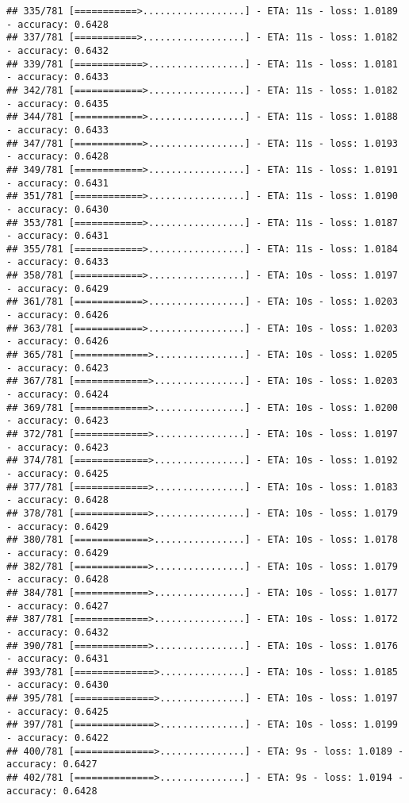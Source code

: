 \documentclass[
]{article}
\begin{document}
\begin{verbatim}
## 335/781 [===========>..................] - ETA: 11s - loss: 1.0189 - accuracy: 0.6428
## 337/781 [===========>..................] - ETA: 11s - loss: 1.0182 - accuracy: 0.6432
## 339/781 [============>.................] - ETA: 11s - loss: 1.0181 - accuracy: 0.6433
## 342/781 [============>.................] - ETA: 11s - loss: 1.0182 - accuracy: 0.6435
## 344/781 [============>.................] - ETA: 11s - loss: 1.0188 - accuracy: 0.6433
## 347/781 [============>.................] - ETA: 11s - loss: 1.0193 - accuracy: 0.6428
## 349/781 [============>.................] - ETA: 11s - loss: 1.0191 - accuracy: 0.6431
## 351/781 [============>.................] - ETA: 11s - loss: 1.0190 - accuracy: 0.6430
## 353/781 [============>.................] - ETA: 11s - loss: 1.0187 - accuracy: 0.6431
## 355/781 [============>.................] - ETA: 11s - loss: 1.0184 - accuracy: 0.6433
## 358/781 [============>.................] - ETA: 10s - loss: 1.0197 - accuracy: 0.6429
## 361/781 [============>.................] - ETA: 10s - loss: 1.0203 - accuracy: 0.6426
## 363/781 [============>.................] - ETA: 10s - loss: 1.0203 - accuracy: 0.6426
## 365/781 [=============>................] - ETA: 10s - loss: 1.0205 - accuracy: 0.6423
## 367/781 [=============>................] - ETA: 10s - loss: 1.0203 - accuracy: 0.6424
## 369/781 [=============>................] - ETA: 10s - loss: 1.0200 - accuracy: 0.6423
## 372/781 [=============>................] - ETA: 10s - loss: 1.0197 - accuracy: 0.6423
## 374/781 [=============>................] - ETA: 10s - loss: 1.0192 - accuracy: 0.6425
## 377/781 [=============>................] - ETA: 10s - loss: 1.0183 - accuracy: 0.6428
## 378/781 [=============>................] - ETA: 10s - loss: 1.0179 - accuracy: 0.6429
## 380/781 [=============>................] - ETA: 10s - loss: 1.0178 - accuracy: 0.6429
## 382/781 [=============>................] - ETA: 10s - loss: 1.0179 - accuracy: 0.6428
## 384/781 [=============>................] - ETA: 10s - loss: 1.0177 - accuracy: 0.6427
## 387/781 [=============>................] - ETA: 10s - loss: 1.0172 - accuracy: 0.6432
## 390/781 [=============>................] - ETA: 10s - loss: 1.0176 - accuracy: 0.6431
## 393/781 [==============>...............] - ETA: 10s - loss: 1.0185 - accuracy: 0.6430
## 395/781 [==============>...............] - ETA: 10s - loss: 1.0197 - accuracy: 0.6425
## 397/781 [==============>...............] - ETA: 10s - loss: 1.0199 - accuracy: 0.6422
## 400/781 [==============>...............] - ETA: 9s - loss: 1.0189 - accuracy: 0.6427 
## 402/781 [==============>...............] - ETA: 9s - loss: 1.0194 - accuracy: 0.6428

\end{verbatim}
\end{document}
